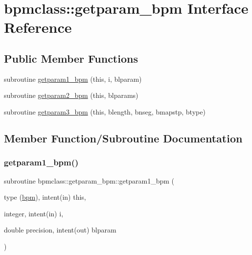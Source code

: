 \hypertarget{interfacebpmclass_1_1getparam__bpm}{}\section{bpmclass\+::getparam\+\_\+bpm Interface Reference}
\label{interfacebpmclass_1_1getparam__bpm}
\subsection*{Public Member Functions}
\begin{DoxyCompactItemize}
\item 
subroutine \mbox{\hyperlink{interfacebpmclass_1_1getparam__bpm_a5adf169af1bdeaa37f87515daba038fb}{getparam1\+\_\+bpm}} (this, i, blparam)
\item 
subroutine \mbox{\hyperlink{interfacebpmclass_1_1getparam__bpm_a6a43932c91f8e19916dc2b5509386030}{getparam2\+\_\+bpm}} (this, blparams)
\item 
subroutine \mbox{\hyperlink{interfacebpmclass_1_1getparam__bpm_afd95f0479ea8dd53ec2fecfa282b42da}{getparam3\+\_\+bpm}} (this, blength, bnseg, bmapstp, btype)
\end{DoxyCompactItemize}


\subsection{Member Function/\+Subroutine Documentation}
\mbox{\label{interfacebpmclass_1_1getparam__bpm_a5adf169af1bdeaa37f87515daba038fb}} 
\subsubsection{\texorpdfstring{getparam1\_bpm()}{getparam1\_bpm()}}
{\footnotesize\ttfamily subroutine bpmclass\+::getparam\+\_\+bpm\+::getparam1\+\_\+bpm (\begin{DoxyParamCaption}\item[{type (\mbox{\hyperlink{namespacebpmclass_structbpmclass_1_1bpm}{bpm}}), intent(in)}]{this,  }\item[{integer, intent(in)}]{i,  }\item[{double precision, intent(out)}]{blparam }\end{DoxyParamCaption})}

